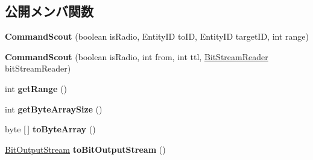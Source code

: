 \subsection*{公開メンバ関数}
\begin{DoxyCompactItemize}
\item 
\hypertarget{classadf_1_1agent_1_1communication_1_1standard_1_1bundle_1_1centralized_1_1CommandScout_aff9ecd70669b3eb58531cd57c32d8555}{}\label{classadf_1_1agent_1_1communication_1_1standard_1_1bundle_1_1centralized_1_1CommandScout_aff9ecd70669b3eb58531cd57c32d8555} 
{\bfseries Command\+Scout} (boolean is\+Radio, Entity\+ID to\+ID, Entity\+ID target\+ID, int range)
\item 
\hypertarget{classadf_1_1agent_1_1communication_1_1standard_1_1bundle_1_1centralized_1_1CommandScout_ac9a91440db6b74364862aee281528f82}{}\label{classadf_1_1agent_1_1communication_1_1standard_1_1bundle_1_1centralized_1_1CommandScout_ac9a91440db6b74364862aee281528f82} 
{\bfseries Command\+Scout} (boolean is\+Radio, int from, int ttl, \hyperlink{classadf_1_1component_1_1communication_1_1util_1_1BitStreamReader}{Bit\+Stream\+Reader} bit\+Stream\+Reader)
\item 
\hypertarget{classadf_1_1agent_1_1communication_1_1standard_1_1bundle_1_1centralized_1_1CommandScout_ae77d422cb3e3fe1fffa6c80a8eb5e7c8}{}\label{classadf_1_1agent_1_1communication_1_1standard_1_1bundle_1_1centralized_1_1CommandScout_ae77d422cb3e3fe1fffa6c80a8eb5e7c8} 
int {\bfseries get\+Range} ()
\item 
\hypertarget{classadf_1_1agent_1_1communication_1_1standard_1_1bundle_1_1centralized_1_1CommandScout_a4627c3fe6e6d80533db053eba19a5f29}{}\label{classadf_1_1agent_1_1communication_1_1standard_1_1bundle_1_1centralized_1_1CommandScout_a4627c3fe6e6d80533db053eba19a5f29} 
int {\bfseries get\+Byte\+Array\+Size} ()
\item 
\hypertarget{classadf_1_1agent_1_1communication_1_1standard_1_1bundle_1_1centralized_1_1CommandScout_a68460d46dad6b559d17a70f08b2ec114}{}\label{classadf_1_1agent_1_1communication_1_1standard_1_1bundle_1_1centralized_1_1CommandScout_a68460d46dad6b559d17a70f08b2ec114} 
byte \mbox{[}$\,$\mbox{]} {\bfseries to\+Byte\+Array} ()
\item 
\hypertarget{classadf_1_1agent_1_1communication_1_1standard_1_1bundle_1_1centralized_1_1CommandScout_a02d53c2c9125cea7714fadf97b2614ba}{}\label{classadf_1_1agent_1_1communication_1_1standard_1_1bundle_1_1centralized_1_1CommandScout_a02d53c2c9125cea7714fadf97b2614ba} 
\hyperlink{classadf_1_1component_1_1communication_1_1util_1_1BitOutputStream}{Bit\+Output\+Stream} {\bfseries to\+Bit\+Output\+Stream} ()

\end{DoxyCompactItemize}
